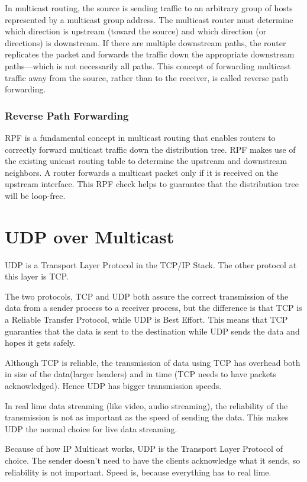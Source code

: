 In multicast routing, the source is sending traffic to an arbitrary group
of hosts represented by a multicast group address. The multicast router
must determine which direction is upstream (toward the source) and which
direction (or directions) is downstream. If there are multiple downstream
paths, the router replicates the packet and forwards the traffic down the
appropriate downstream paths—which is not necessarily all paths. This
concept of forwarding multicast traffic away from the source, rather than
to the receiver, is called reverse path forwarding. 

\subsubsection{Reverse Path Forwarding}

\cite{cisco:multicast}
\ac{RPF} is a fundamental concept in multicast routing
that enables routers to correctly forward multicast traffic down the
distribution tree. \ac{RPF} makes use of the existing unicast routing table to
determine the upstream and downstream neighbors. A router forwards a
multicast packet only if it is received on the upstream interface. This
\ac{RPF}
check helps to guarantee that the distribution tree will be loop-free. 

\section{UDP over Multicast}

\ac{UDP} is a Transport Layer Protocol in the TCP/IP Stack. The other
protocol at this layer is \ac{TCP}.

The two protocols, TCP and UDP both assure the correct transmission of the
data from a sender process to a receiver process, but the difference is
that TCP is a Reliable Transfer Protocol, while UDP is Best Effort. This
means that TCP guaranties that the data is sent to the destination while
UDP sends the data and hopes it gets safely.

Although TCP is reliable, the transmission of data using TCP has overhead
both in size of the data(larger headers) and in time (TCP needs to have
packets acknowledged). Hence UDP has bigger transmission speeds.

In real lime data streaming (like video, audio streaming), the reliability
of the transmission is not as important as the speed of sending the data.
This makes UDP the normal choice for live data streaming.

Because of how IP Multicast works, UDP is the Transport Layer Protocol of
choice. The sender doesn't need to have the clients acknowledge what it
sends, so reliability is not important. Speed is, because everything has to
real lime.

